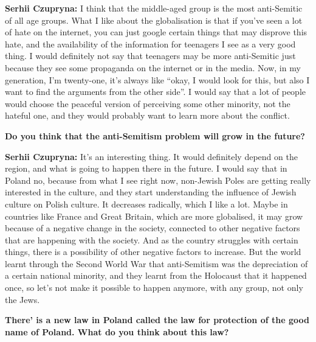 \textbf{Serhii Czupryna:} I think that the middle-aged group is the most anti-Semitic of all age groups. What I like about the globalisation is that if you’ve seen a lot of hate on the internet, you can just google certain things that may disprove this hate, and the availability of the information for teenagers I see as a very good thing. I would definitely not say that teenagers may be more anti-Semitic just because they see some propaganda on the internet or in the media. Now, in my generation, I’m twenty-one, it’s always like “okay, I would look for this, but also I want to find the arguments from the other side”. I would say that a lot of people would choose the peaceful version of perceiving some other minority, not the hateful one, and they would probably want to learn more about the conflict.\par
\textbf{Do you think that the anti-Semitism problem will grow in the future?}\par
\textbf{Serhii Czupryna:} It’s an interesting thing. It would definitely depend on the region, and what is going to happen there in the future. I would say that in Poland no, because from what I see right now, non-Jewish Poles are getting really interested in the culture, and they start understanding the influence of Jewish culture on Polish culture. It decreases radically, which I like a lot. Maybe in countries like France and Great Britain, which are more globalised, it may grow because of a negative change in the society, connected to other negative factors that are happening with the society. And as the country struggles with certain things, there is a possibility of other negative factors to increase. But the world learnt through the Second World War that anti-Semitism was the depreciation of a certain national minority, and they learnt from the Holocaust that it happened once, so let’s not make it possible to happen anymore, with any group, not only the Jews.\par
\textbf{There’ is a new law in Poland called the law for protection of the good name of Poland. What do you think about this law?} \par
